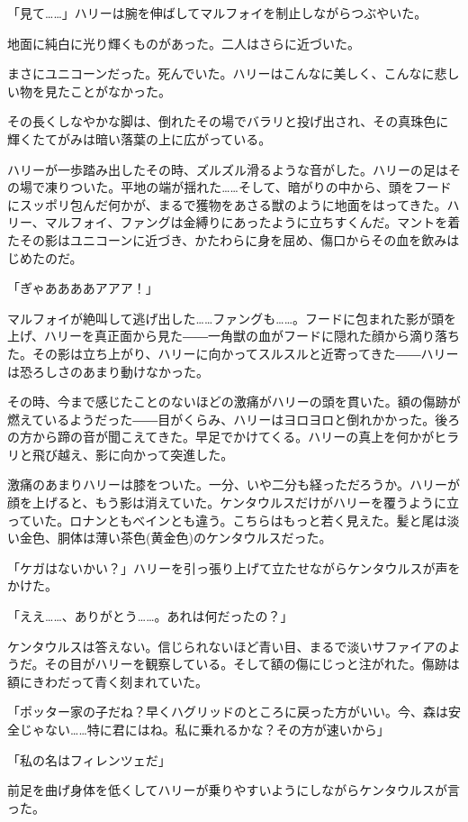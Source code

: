 \documentclass[10pt,a4paper]{article}
\begin{document}
\begin{CJK}{UTF8}{min}
「見て……」ハリーは腕を伸ばしてマルフォイを制止しながらつぶやいた。

地面に純白に光り輝くものがあった。二人はさらに近づいた。

まさにユニコーンだった。死んでいた。ハリーはこんなに美しく、こんなに悲しい物を見たことがなかった。

その長くしなやかな脚は、倒れたその場でバラリと投げ出され、その真珠色に輝くたてがみは暗い落葉の上に広がっている。

ハリーが一歩踏み出したその時、ズルズル滑るような音がした。ハリーの足はその場で凍りついた。平地の端が揺れた……そして、暗がりの中から、頭をフードにスッポリ包んだ何かが、まるで獲物をあさる獣のように地面をはってきた。ハリー、マルフォイ、ファングは金縛りにあったように立ちすくんだ。マントを着たその影はユニコーンに近づき、かたわらに身を屈め、傷口からその血を飲みはじめたのだ。

「ぎゃああああアアア！」

マルフォイが絶叫して逃げ出した……ファングも……。フードに包まれた影が頭を上げ、ハリーを真正面から見た――一角獣の血がフードに隠れた顔から滴り落ちた。その影は立ち上がり、ハリーに向かってスルスルと近寄ってきた――ハリーは恐ろしさのあまり動けなかった。

その時、今まで感じたことのないほどの激痛がハリーの頭を貫いた。額の傷跡が燃えているようだった――目がくらみ、ハリーはヨロヨロと倒れかかった。後ろの方から蹄の音が聞こえてきた。早足でかけてくる。ハリーの真上を何かがヒラリと飛び越え、影に向かって突進した。

激痛のあまりハリーは膝をついた。一分、いや二分も経っただろうか。ハリーが顔を上げると、もう影は消えていた。ケンタウルスだけがハリーを覆うように立っていた。ロナンともべインとも違う。こちらはもっと若く見えた。髪と尾は淡い金色、胴体は薄い茶色(黄金色)のケンタウルスだった。

「ケガはないかい？」ハリーを引っ張り上げて立たせながらケンタウルスが声をかけた。

「ええ……、ありがとう……。あれは何だったの？」

ケンタウルスは答えない。信じられないほど青い目、まるで淡いサファイアのようだ。その目がハリーを観察している。そして額の傷にじっと注がれた。傷跡は額にきわだって青く刻まれていた。

「ポッター家の子だね？早くハグリッドのところに戻った方がいい。今、森は安全じゃない……特に君にはね。私に乗れるかな？その方が速いから」

「私の名はフィレンツェだ」

前足を曲げ身体を低くしてハリーが乗りやすいようにしながらケンタウルスが言った。


\end{CJK}
\end{document}
